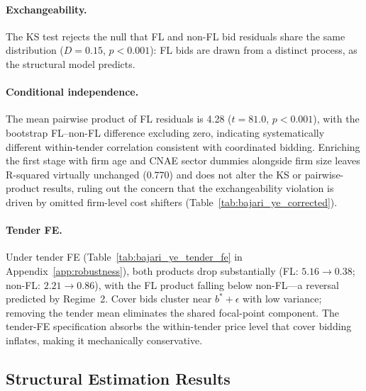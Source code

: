 \paragraph{Exchangeability.}
The KS test rejects the null that FL and non-FL bid residuals share
the same distribution ($D = 0.15$, $p < 0.001$): FL bids are drawn
from a distinct process, as the structural model predicts.

\paragraph{Conditional independence.}
The mean pairwise product of FL residuals is 4.28 ($t = 81.0$,
$p < 0.001$), with the bootstrap FL--non-FL difference
excluding zero, indicating systematically different within-tender
correlation consistent with coordinated bidding. Enriching the
first stage with firm age and CNAE sector dummies alongside firm
size leaves R-squared virtually unchanged (0.770) and does not
alter the KS or pairwise-product results, ruling out the concern
that the exchangeability violation is driven by omitted firm-level
cost shifters (Table~\ref{tab:bajari_ye_corrected}).

\paragraph{Tender FE.}
Under tender FE (Table~\ref{tab:bajari_ye_tender_fe} in
Appendix~\ref{app:robustness}), both products drop substantially
(FL: $5.16 \to 0.38$; non-FL: $2.21 \to 0.86$), with the FL product
falling below non-FL---a reversal predicted by Regime~2. Cover bids
cluster near $b^* + \epsilon$ with low variance; removing the tender
mean eliminates the shared focal-point component. The tender-FE
specification absorbs the within-tender price level that cover bidding
inflates, making it mechanically conservative.




\subsection{Structural Estimation Results}
\label{sec:results_structural}

